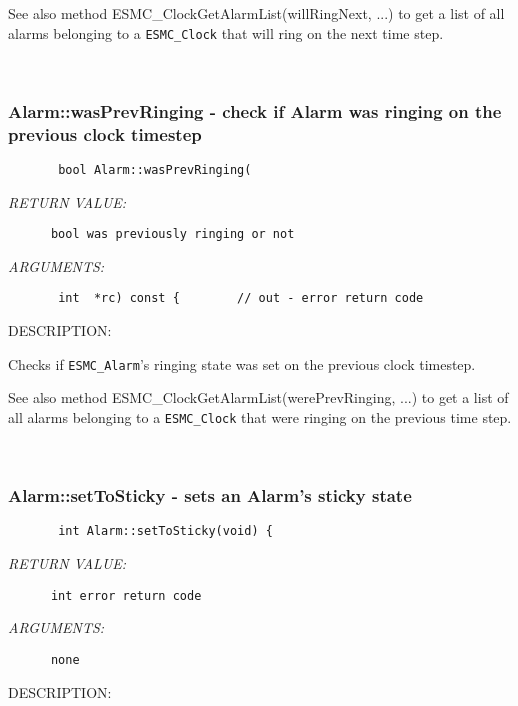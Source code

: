       See also method ESMC\_ClockGetAlarmList(willRingNext, ...) to get
      a list of all alarms belonging to a {\tt ESMC\_Clock} that will ring on
      the next time step.
 
   
 
\mbox{}\hrulefill\ 
 
\subsubsection [Alarm::wasPrevRinging] {Alarm::wasPrevRinging - check if Alarm was ringing on the previous clock timestep}


  
\begin{verbatim}       bool Alarm::wasPrevRinging(\end{verbatim}{\em RETURN VALUE:}
\begin{verbatim}      bool was previously ringing or not\end{verbatim}{\em ARGUMENTS:}
\begin{verbatim}       int  *rc) const {        // out - error return code\end{verbatim}
{\sf DESCRIPTION:\\ }


      Checks if {\tt ESMC\_Alarm}'s ringing state was set on the previous
      clock timestep.
  
      See also method ESMC\_ClockGetAlarmList(werePrevRinging, ...) to
      get a list of all alarms belonging to a {\tt ESMC\_Clock} that were
      ringing on the previous time step.
 
   
 
\mbox{}\hrulefill\ 
 
\subsubsection [Alarm::setToSticky] {Alarm::setToSticky - sets an Alarm's sticky state }


  
\begin{verbatim}       int Alarm::setToSticky(void) {\end{verbatim}{\em RETURN VALUE:}
\begin{verbatim}      int error return code\end{verbatim}{\em ARGUMENTS:}
\begin{verbatim}      none\end{verbatim}
{\sf DESCRIPTION:\\ }


